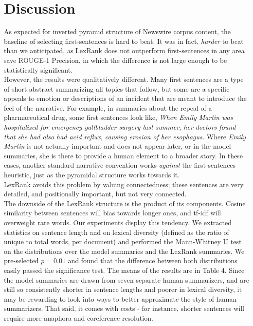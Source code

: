 \documentclass[11pt]{article}
\begin{document}
\section{Discussion}
As expected for inverted pyramid structure of Newswire corpus content, the baseline of selecting first-sentences is hard to beat. It was in fact, \textit{harder} to beat than we anticipated, as LexRank does not outperform first-sentences in any area save ROUGE-1 Precision, in which the difference is not large enough to be statistically significant. \\
However, the results were qualitatively different. Many first sentences are a type of short abstract summarizing all topics that follow, but some are a specific appeals to emotion or descriptions of an incident that are meant to introduce the feel of the narrative. For example, in summaries about the repeal of a pharmaceutical drug, some first sentences look like, \textit{When Emily Martin was hospitalized for emergency gallbladder surgery last summer, her doctors found that she had also had acid reflux, causing erosion of her esophagus.} Where \textit{Emily Martin} is not actually important and does not appear later, or in the model summaries, she is there to provide a human element to a broader story. In these cases, another standard narrative convention works \textit{against} the first-sentences heuristic, just as the pyramidal structure works towards it.\\
LexRank avoids this problem by valuing connectedness; these sentences are very detailed, and positionally important, but not very connected.\\
The downside of the LexRank structure is the product of its components. Cosine similarity between sentences will bias towards longer ones, and tf-idf will overweight rare words. Our experiments display this tendency. We extracted statistics on sentence length and on lexical diversity (defined as the ratio of unique to total words, per document) and performed the Mann-Whitney U test on the distributions over the model summaries and the LexRank summaries. We pre-selected $p=0.01$ and found that the difference between both distributions easily passed the significance test. The means of the results are in Table 4. Since the model summaries are drawn from seven separate human summarizers, and are still so consistently shorter in sentence lengths and poorer in lexical diversity, it may be rewarding to look into ways to better approximate the style of human summarizers. That said, it comes with costs - for instance, shorter sentences will require more anaphora and coreference resolution.\\ 
\end{document}
